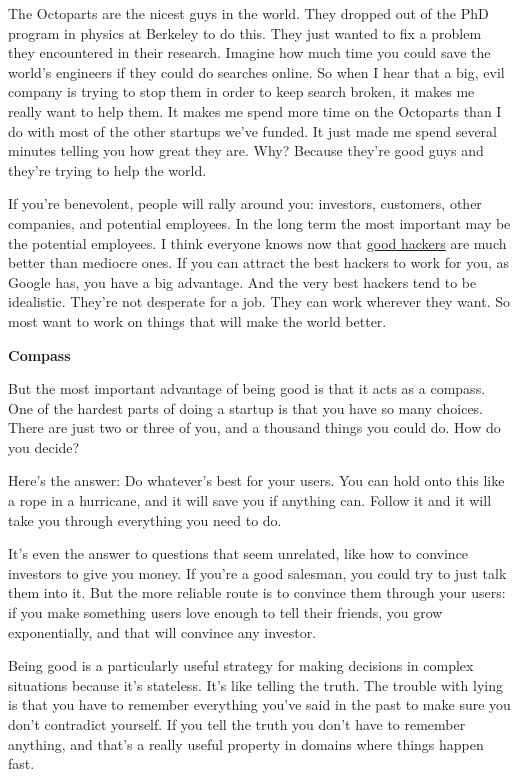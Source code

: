 \documentclass[12pt]{book}
\begin{document}
The Octoparts are the nicest guys in the world. They dropped out of the
PhD program in physics at Berkeley to do this. They just wanted to fix a
problem they encountered in their research. Imagine how much time you
could save the world's engineers if they could do searches online. So
when I hear that a big, evil company is trying to stop them in order to
keep search broken, it makes me really want to help them. It makes me
spend more time on the Octoparts than I do with most of the other
startups we've funded. It just made me spend several minutes telling you
how great they are. Why? Because they're good guys and they're trying to
help the world.

If you're benevolent, people will rally around you: investors,
customers, other companies, and potential employees. In the long term
the most important may be the potential employees. I think everyone
knows now that \href{gh.html}{good hackers} are much better than
mediocre ones. If you can attract the best hackers to work for you, as
Google has, you have a big advantage. And the very best hackers tend to
be idealistic. They're not desperate for a job. They can work wherever
they want. So most want to work on things that will make the world
better.

\textbf{Compass}

But the most important advantage of being good is that it acts as a
compass. One of the hardest parts of doing a startup is that you have so
many choices. There are just two or three of you, and a thousand things
you could do. How do you decide?

Here's the answer: Do whatever's best for your users. You can hold onto
this like a rope in a hurricane, and it will save you if anything can.
Follow it and it will take you through everything you need to do.

It's even the answer to questions that seem unrelated, like how to
convince investors to give you money. If you're a good salesman, you
could try to just talk them into it. But the more reliable route is to
convince them through your users: if you make something users love
enough to tell their friends, you grow exponentially, and that will
convince any investor.

Being good is a particularly useful strategy for making decisions in
complex situations because it's stateless. It's like telling the truth.
The trouble with lying is that you have to remember everything you've
said in the past to make sure you don't contradict yourself. If you tell
the truth you don't have to remember anything, and that's a really
useful property in domains where things happen fast.
\end{document}
